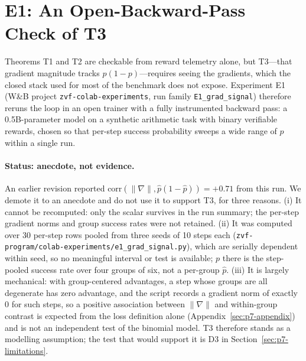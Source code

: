 \section{E1: An Open-Backward-Pass Check of T3}
\label{sec:p7-e1}
Theorems T1 and T2 are checkable from reward telemetry alone, but T3---that
gradient magnitude tracks $p(1-p)$---requires seeing the gradients, which
the closed stack used for most of the benchmark does not expose. Experiment
E1 (W\&B project \texttt{zvf-colab-experiments}, run family
\mbox{\texttt{E1\_grad\_signal}}) therefore reruns the loop in an open trainer with
a fully instrumented backward pass: a 0.5B-parameter model on a synthetic
arithmetic task with binary verifiable rewards, chosen so that per-step
success probability sweeps a wide range of $p$ within a single run.

\paragraph{Status: anecdote, not evidence.} An earlier revision reported
$\mathrm{corr}(\|\nabla\|,\hat p(1-\hat p))=+0.71$ from this run. We demote it
to an anecdote and do not use it to support T3, for three reasons. (i) It
cannot be recomputed: only the scalar survives in the run summary; the
per-step gradient norms and group success rates were not retained. (ii) It was
computed over 30 per-step rows pooled from three seeds of 10 steps each
(\texttt{zvf-program/colab-experiments/e1\_grad\_signal.py}), which are
serially dependent within seed, so no meaningful interval or test is
available; $p$ there is the step-pooled success rate over four groups of six,
not a per-group $\hat p$. (iii) It is largely
mechanical: with group-centered advantages, a step whose groups are all
degenerate has zero advantage, and the script records a gradient norm of
exactly $0$ for such steps, so a
positive association between $\|\nabla\|$ and within-group contrast is expected
from the loss definition alone (Appendix~\ref{sec:p7-appendix}) and is not an
independent test of the binomial model. T3 therefore stands as a modelling
assumption; the test that would support it is D3 in
Section~\ref{sec:p7-limitations}.
